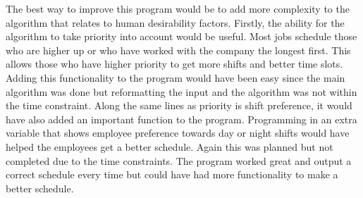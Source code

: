 \documentclass[a4paper,11pt]{article}
\begin{document}
The best way to improve this program would be to add more complexity to the algorithm that relates to human desirability factors. Firstly, the ability for the algorithm to take priority into account would be useful. Most jobs schedule those who are higher up or who have worked with the company the longest first. This allows those who have higher priority to get more shifts and better time slots. Adding this functionality to the program would have been easy since the main algorithm was done but reformatting the input and the algorithm was not within the time constraint.  Along the same lines as priority is shift preference, it would have also added an important function to the program.  Programming in an extra variable that shows employee preference towards day or night shifts would have helped the employees get a better schedule.  Again this was planned but not completed due to the time constraints.  The program worked great and output a correct schedule every time but could have had more functionality to make a better schedule. 
\end{document}
